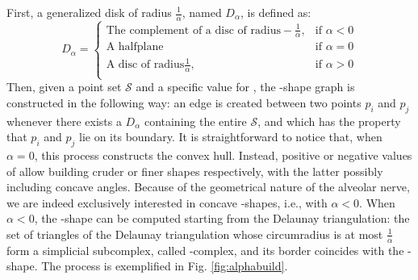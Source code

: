First, a generalized disk of radius $\frac{1}{\alpha}$, named $D_\alpha$, is
defined as:
$$
D_\alpha=
\begin{cases}
  \text{The complement of a disc of radius} -\frac{1}{\alpha}, & \text{if $\alpha<0$}\\
  \text{A halfplane} & \text{if $\alpha=0$}\\
  \text{A disc of radius} \frac{1}{\alpha}, & \text{if $\alpha>0$}\\
\end{cases}
$$
Then, given a point set $\mathcal{S}$ and a specific value for \textalpha, the
\textalpha-shape graph is constructed in the following way: an edge is
created between two points $p_i$ and $p_j$ whenever there exists
a $D_\alpha$ containing the entire $\mathcal{S}$, and which has the property
that $p_i$ and $p_j$ lie on its boundary. It is straightforward to
notice that, when $\alpha = 0$, this process constructs the convex
hull. Instead, positive or negative values of \textalpha\;allow building
cruder or finer shapes respectively, with the latter possibly including concave
angles. Because of the geometrical nature of the alveolar nerve, we are indeed
exclusively interested in concave \textalpha-shapes, i.e., with $\alpha < 0$.
When $\alpha < 0$, the \textalpha-shape can be computed starting from the
Delaunay triangulation: the set of triangles of the Delaunay triangulation whose
circumradius is at most $\frac{1}{\alpha}$ form a simplicial subcomplex, called
\textalpha-complex, and its border coincides with the \textalpha-shape.
The process is exemplified in Fig. \ref{fig:alphabuild}.

